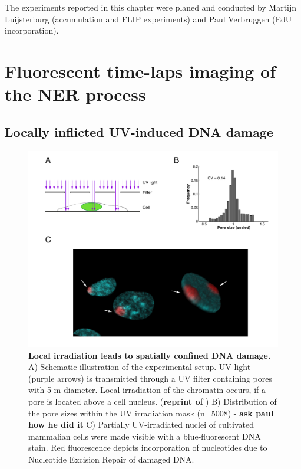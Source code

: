 The experiments reported in this chapter were planed and conducted by Martijn Luijsterburg (accumulation and FLIP experiments) and Paul Verbruggen (EdU incorporation).
	
	
\section{Fluorescent time-laps imaging of the NER process}

\subsection{Locally inflicted UV-induced DNA damage}
\label{sec:local_irradiation}
\begin{figure}[htbp]
	\begin{center}
		\includegraphics[width=1\textwidth]{Abbildungen/figure2_1.pdf}
		\caption{\textbf{Local irradiation leads to spatially confined DNA damage.} A) Schematic illustration of the experimental setup. UV-light (purple arrows) is transmitted through a UV filter containing pores with 5 \textmu m diameter. Local irradiation of the chromatin occurs, if a pore is located above a cell nucleus. (\textbf{reprint of }) B) Distribution of the pore sizes within the UV irradiation mask (n=5008) - \textbf{ask paul how he did it} C) Partially UV-irradiated nuclei of cultivated mammalian cells were made visible with a blue-fluorescent DNA stain. Red fluorescence depicts incorporation of nucleotides due to Nucleotide Excision Repair of damaged DNA.}
		\label{fig:accuMethod}
	\end{center}
\end{figure} 

